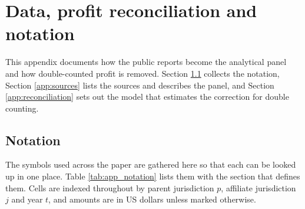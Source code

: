 \documentclass[11pt,a4paper]{article}
\begin{document}
\section{Data, profit reconciliation and notation}\label{app:data}

This appendix documents how the public reports become the analytical panel and how double-counted profit is removed. Section \ref{app:notation} collects the notation, Section \ref{app:sources} lists the sources and describes the panel, and Section \ref{app:reconciliation} sets out the model that estimates the correction for double counting.

\subsection{Notation}\label{app:notation}

The symbols used across the paper are gathered here so that each can be looked up in one place. Table \ref{tab:app_notation} lists them with the section that defines them. Cells are indexed throughout by parent jurisdiction $p$, affiliate jurisdiction $j$ and year $t$, and amounts are in US dollars unless marked otherwise.
\end{document}
